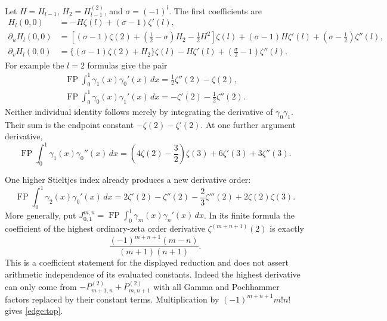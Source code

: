 Let $H=H_{l-1}$, $H_2=H_{l-1}^{(2)}$, and
$\sigma=(-1)^l$.  The first coefficients are
\begin{align}
 H_l(0,0)&=-H\zeta(l)+(\sigma-1)\zeta'(l),\\
 \partial_u H_l(0,0)
 &=\left[(\sigma-1)\zeta(2)+\left(\frac12-\sigma\right)H_2
                          -\frac12H^2\right]\zeta(l)
       +(\sigma-1)H\zeta'(l)
       +\left(\sigma-\frac12\right)\zeta''(l),
       \label{edge:firstu}\\
 \partial_v H_l(0,0)
 &=\{(\sigma-1)\zeta(2)+H_2\}\zeta(l)
       -H\zeta'(l)+\left(\frac\sigma2-1\right)\zeta''(l).
       \label{edge:firstv}
\end{align}
For example the $l=2$ formulas give the pair
\begin{align}
 \boxed{\operatorname{FP}\int_0^1
       \gamma_1(x)\gamma_0'(x)\,dx
          =\frac12\zeta''(2)-\zeta(2),}
       \label{edge:example10}\\
 \boxed{\operatorname{FP}\int_0^1
       \gamma_0(x)\gamma_1'(x)\,dx
          =-\zeta'(2)-\frac12\zeta''(2).}
       \label{edge:example01}
\end{align}
Neither individual identity follows merely by integrating the
derivative of $\gamma_0\gamma_1$.  Their sum is the endpoint
constant $-\zeta(2)-\zeta'(2)$.
At one further argument derivative,
\begin{equation}
 \operatorname{FP}\int_0^1\gamma_1(x)\gamma_0''(x)\,dx
  =\left(4\zeta(2)-\frac32\right)\zeta(3)
          +6\zeta'(3)+3\zeta''(3).
 \label{edge:example12}
\end{equation}

One higher Stieltjes index already produces a new derivative order:
\begin{equation}
 \operatorname{FP}\int_0^1\gamma_2(x)\gamma_0'(x)\,dx
 =2\zeta'(2)-\zeta''(2)-\frac23\zeta'''(2)
                         +2\zeta(2)\zeta(3).
 \label{edge:example20}
\end{equation}
More generally, put $J_{0,1}^{m,n}=\operatorname{FP}\int_0^1
\gamma_m(x)\gamma_n'(x)\,dx$.  In its finite formula the
coefficient of the highest ordinary-zeta
order derivative $\zeta^{(m+n+1)}(2)$ is exactly
\begin{equation}
 \frac{(-1)^{m+n+1}(m-n)}{(m+1)(n+1)}.
 \label{edge:top}
\end{equation}
This is a coefficient statement for the displayed reduction and does
not assert arithmetic independence of its evaluated constants.
Indeed the highest derivative can only come from
$-P^{(2)}_{m+1,n}+P^{(2)}_{m,n+1}$ with all Gamma and
Pochhammer factors replaced by their constant terms.  Multiplication
by $(-1)^{m+n+1}m!n!$ gives \eqref{edge:top}.

